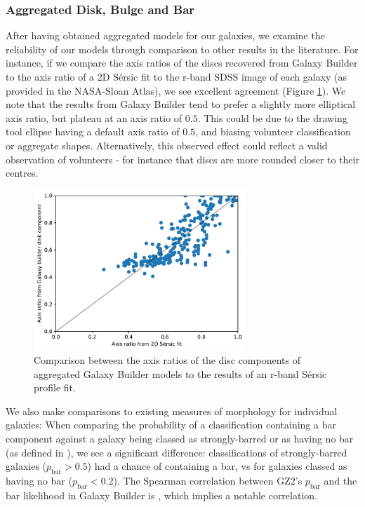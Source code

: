 \documentclass[../main.tex]{subfiles}
\begin{document}
\subsubsection{Aggregated Disk, Bulge and Bar}
After having obtained aggregated models for our galaxies, we examine the reliability of our models through comparison to other results in the literature. For instance, if we compare the axis ratios of the discs recovered from Galaxy Builder to the axis ratio of a 2D S\'ersic fit to the r-band SDSS image of each galaxy (as provided in the NASA-Sloan Atlas), we see excellent agreement (Figure \ref{fig:ax_ratio_comparison}). We note that the results from Galaxy Builder tend to prefer a slightly more elliptical axis ratio, but plateau at an axis ratio of $0.5$. This could be due to the drawing tool ellipse having a default axis ratio of $0.5$, and biasing volunteer classification or aggregate shapes. Alternatively, this observed effect could reflect a valid observation of volunteers - for instance that discs are more rounded closer to their centres.


\begin{figure}
  \includegraphics[width=8cm]{images__results/GZBvsNSA_ax-ratio_SERSIC_BA.pdf}
  \caption{Comparison between the axis ratios of the disc components of aggregated Galaxy Builder models to the results of an r-band S\'ersic profile fit.}
  \label{fig:ax_ratio_comparison}
\end{figure}

We also make comparisons to existing measures of morphology for individual galaxies: When comparing the probability of a classification containing a bar component against a galaxy being classed as strongly-barred or as having no bar (as defined in \citealt{Masters2010:1003.0449v2}), we see a significant difference: classifications of strongly-barred galaxies ($p_\text{bar} > 0.5$) had a  chance of containing a bar, vs  for galaxies classed as having no bar ($p_\text{bar} < 0.2$). The Spearman correlation between GZ2's $p_\text{bar}$ and the bar likelihood in Galaxy Builder is , which implies a notable correlation.
\end{document}
